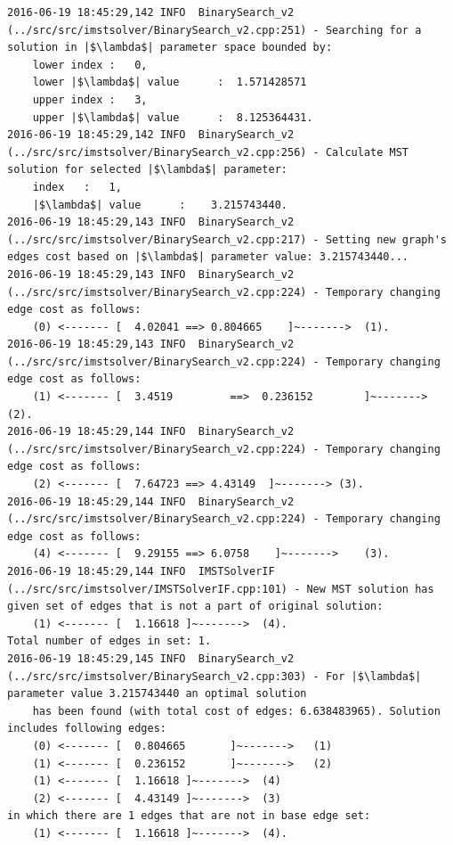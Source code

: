 \begin{verbatim}
2016-06-19 18:45:29,142 INFO  BinarySearch_v2 (../src/src/imstsolver/BinarySearch_v2.cpp:251) - Searching for a solution in |$\lambda$| parameter space bounded by:
	lower index	:	0,
	lower |$\lambda$| value      :	1.571428571
	upper index	:	3,
	upper |$\lambda$| value      :	8.125364431.
2016-06-19 18:45:29,142 INFO  BinarySearch_v2 (../src/src/imstsolver/BinarySearch_v2.cpp:256) - Calculate MST solution for selected |$\lambda$| parameter:
	index	:	1,
	|$\lambda$| value      :	3.215743440.
2016-06-19 18:45:29,143 INFO  BinarySearch_v2 (../src/src/imstsolver/BinarySearch_v2.cpp:217) - Setting new graph's edges cost based on |$\lambda$| parameter value: 3.215743440...
2016-06-19 18:45:29,143 INFO  BinarySearch_v2 (../src/src/imstsolver/BinarySearch_v2.cpp:224) - Temporary changing edge cost as follows:
	(0)	<------- [	4.02041	==>	0.804665	]~------->	(1).
2016-06-19 18:45:29,143 INFO  BinarySearch_v2 (../src/src/imstsolver/BinarySearch_v2.cpp:224) - Temporary changing edge cost as follows:
	(1)	<------- [	3.4519         ==>	0.236152        ]~------->	(2).
2016-06-19 18:45:29,144 INFO  BinarySearch_v2 (../src/src/imstsolver/BinarySearch_v2.cpp:224) - Temporary changing edge cost as follows:
	(2)	<------- [	7.64723	==>	4.43149	 ]~------->	(3).
2016-06-19 18:45:29,144 INFO  BinarySearch_v2 (../src/src/imstsolver/BinarySearch_v2.cpp:224) - Temporary changing edge cost as follows:
	(4)	<------- [	9.29155	==>	6.0758	  ]~------->	(3).
2016-06-19 18:45:29,144 INFO  IMSTSolverIF (../src/src/imstsolver/IMSTSolverIF.cpp:101) - New MST solution has given set of edges that is not a part of original solution:
	(1)	<------- [	1.16618	]~------->	(4).
Total number of edges in set: 1.
2016-06-19 18:45:29,145 INFO  BinarySearch_v2 (../src/src/imstsolver/BinarySearch_v2.cpp:303) - For |$\lambda$| parameter value 3.215743440 an optimal solution 
	has been found (with total cost of edges: 6.638483965). Solution includes following edges:
	(0)	<------- [	0.804665       ]~------->	(1)
	(1)	<------- [	0.236152       ]~------->	(2)
	(1)	<------- [	1.16618	]~------->	(4)
	(2)	<------- [	4.43149	]~------->	(3)
in which there are 1 edges that are not in base edge set:
	(1)	<------- [	1.16618	]~------->	(4).
\end{verbatim}
